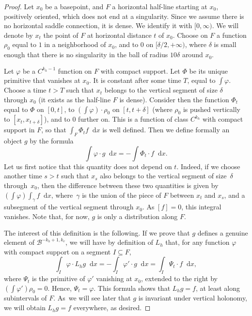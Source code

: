 \documentclass[10pt]{amsart}
\newcommand{\boB}{\mathcal{B}}
\newcommand{\dd}{\mathop{}\!\mathrm{d}}
\let\phi\varphi
\theoremstyle{definition}
\numberwithin{equation}{section}
\begin{document}
\begin{proof}
Let $x_0$ be a basepoint, and $F$ a horizontal half-line starting at $x_0$,
positively oriented, which does not end at a singularity. Since we assume
there is no horizontal saddle connection, it is dense. We identify it with
$[0,\infty)$. We will denote by $x_t$ the point of $F$ at horizontal distance
$t$ of $x_0$. Choose on $F$ a function $\rho_0$ equal to $1$ in a
neighborhood of $x_0$, and to $0$ on $[\delta/2, +\infty)$, where $\delta$ is
small enough that there is no singularity in the ball of radius $10\delta$
around $x_0$.

Let $\phi$ be a $C^{k_h-1}$ function on $F$ with compact support. Let $\Phi$
be its unique primitive that vanishes at $x_0$. It is constant after some
time $T$, equal to $\int \phi$. Choose a time $t>T$ such that $x_t$ belongs
to the vertical segment of size $\delta$ through $x_0$ (it exists as the
half-line $F$ is dense). Consider then the function $\Phi_t$ equal to $\Phi$
on $[0, t]$, to $(\int \phi) \cdot \rho_0$ on $[t, t+\delta]$ (where $\rho_0$
is pushed vertically to $[x_t, x_{t+\delta}]$), and to $0$ further on. This
is a function of class $C^{k_h}$ with compact support in $F$, so that $\int_F
\Phi_t f \dd x$ is well defined. Then we define formally an object $g$ by the
formula
\begin{equation}
\label{eq:ipwuxcviopuw}
\int \phi\cdot g \dd x = -\int \Phi_t \cdot f \dd x.
\end{equation}
Let us first notice that this quantity does not depend on $t$. Indeed, if we
choose another time $s>t$ such that $x_s$ also belongs to the vertical
segment of size~$\delta$ through~$x_0$, then the difference between these two
quantities is given by $(\int \phi) \int_\gamma f \dd x$, where~$\gamma$ is
the union of the piece of $F$ between $x_t$ and $x_s$, and a subsegment of
the vertical segment through $x_0$. As $[f] = 0$, this integral vanishes.
Note that, for now, $g$ is only a distribution along $F$.

The interest of this definition is the following. If we prove that $g$
defines a genuine element of $\boB^{-k_h+1, k_v}$, we will have by definition
of $L_h$ that, for any function $\phi$ with compact support on a segment $I
\subseteq F$,
\begin{equation*}
\int_I \phi \cdot L_h g \dd x = -\int_I \phi' \cdot g \dd x
=\int_I \Psi_t \cdot f \dd x,
\end{equation*}
where $\Psi_t$ is the primitive of $\phi'$ vanishing at $x_0$, extended to
the right by $(\int\phi') \rho_0 = 0$. Hence, $\Psi_t = \phi$. This formula
shows that $L_h g = f$, at least along subintervals of $F$. As~we will see
later that $g$ is invariant under vertical holonomy, we will obtain $L_h g =
f$ everywhere, as desired.


\end{proof}
\end{document}
